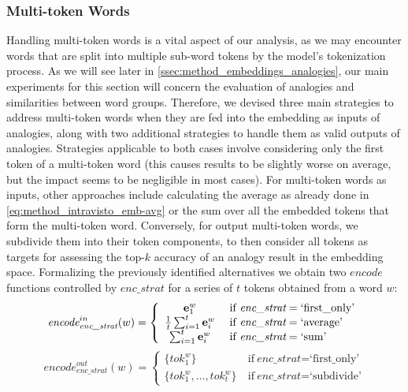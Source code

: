 \subsubsection{Multi-token Words}

Handling multi-token words is a vital aspect of our analysis, as we may encounter words that are split into multiple sub-word tokens by the model's tokenization process.
As we will see later in \cref{ssec:method_embeddings_analogies}, our main experiments for this section will concern the evaluation of analogies and similarities between word groups.
Therefore, we devised three main strategies to address multi-token words when they are fed into the embedding as inputs of analogies, along with two additional strategies to handle them as valid outputs of analogies.
Strategies applicable to both cases involve considering only the first token of a multi-token word (this causes results to be slightly worse on average, but the impact seems to be negligible in most cases).
For multi-token words as inputs, other approaches include calculating the average as already done in \cref{eq:method_intravisto_emb-avg} or the sum over all the embedded tokens that form the multi-token word.
Conversely, for output multi-token words, we subdivide them into their token components, to then consider all tokens as targets for assessing the top-$k$ accuracy of an analogy result in the embedding space.
Formalizing the previously identified alternatives we obtain two $\textit{encode}$ functions controlled by $\textit{enc\_strat}$ for a series of $t$ tokens obtained from a word $w$:
\begin{equation}
    \label{eq:method_embeddings_multitok-in}
    {\textit{encode}}_{\textit{enc\_strat}}^{in}(w) = 
    \left\{
    \begin{array}{cl}
        \gbm{e}_1^w &\ \text{if}\ \textit{enc\_strat} = \text{`first\_only'} \\
        \frac{1}{t}\sum_{i=1}^{t}{\gbm{e}_i^w} &\ \text{if}\ \textit{enc\_strat} = \text{`average'} \\
        \sum_{i=1}^{t}{\gbm{e}_i^w} &\ \text{if}\ \textit{enc\_strat} = \text{`sum'}
    \end{array}
    \right.
\end{equation}
\begin{equation}
    \label{eq:method_embeddings_multitok-out}
    {\textit{encode}}_{\textit{enc\_strat}}^{out}(w) = 
    \left\{
    \begin{array}{cl}
        \{ tok_1^w \} &\ \text{if}\ \textit{enc\_strat} = \text{`first\_only'} \\
        \{ tok_1^w, \ldots, tok_t^w \} &\ \text{if}\ \textit{enc\_strat} = \text{`subdivide'}
    \end{array}
    \right.
\end{equation}
